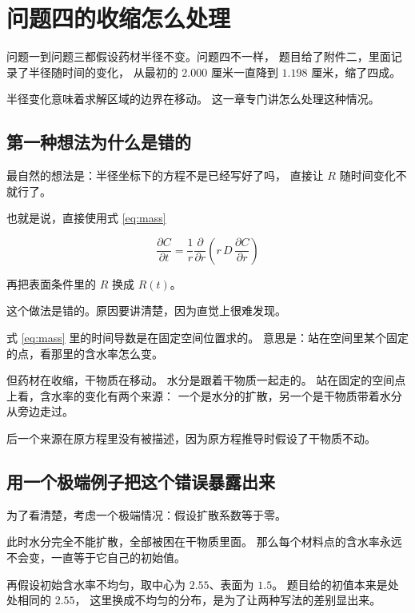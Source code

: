 \section{问题四的收缩怎么处理}

问题一到问题三都假设药材半径不变。问题四不一样，
题目给了附件二，里面记录了半径随时间的变化，
从最初的 $2.000$ 厘米一直降到 $1.198$ 厘米，缩了四成。

半径变化意味着求解区域的边界在移动。
这一章专门讲怎么处理这种情况。

\subsection{第一种想法为什么是错的}

最自然的想法是：半径坐标下的方程不是已经写好了吗，
直接让 $R$ 随时间变化不就行了。

也就是说，直接使用式 \eqref{eq:mass}

\begin{equation}
\frac{\partial C}{\partial t}
= \frac{1}{r}\frac{\partial}{\partial r}\left(r\,D\,\frac{\partial C}{\partial r}\right)
\end{equation}

再把表面条件里的 $R$ 换成 $R(t)$。

这个做法是错的。原因要讲清楚，因为直觉上很难发现。

式 \eqref{eq:mass} 里的时间导数是在固定空间位置求的。
意思是：站在空间里某个固定的点，看那里的含水率怎么变。

但药材在收缩，干物质在移动。
水分是跟着干物质一起走的。
站在固定的空间点上看，含水率的变化有两个来源：
一个是水分的扩散，另一个是干物质带着水分从旁边走过。

后一个来源在原方程里没有被描述，因为原方程推导时假设了干物质不动。

\subsection{用一个极端例子把这个错误暴露出来}

为了看清楚，考虑一个极端情况：假设扩散系数等于零。

此时水分完全不能扩散，全部被困在干物质里面。
那么每个材料点的含水率永远不会变，一直等于它自己的初始值。

再假设初始含水率不均匀，取中心为 $2.55$、表面为 $1.5$。
题目给的初值本来是处处相同的 $2.55$，
这里换成不均匀的分布，是为了让两种写法的差别显出来。

